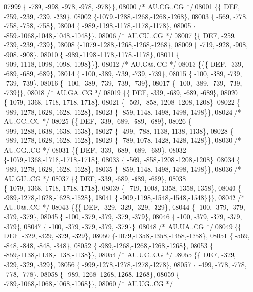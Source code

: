 \begin{DoxyCode}
07999 \{ -789, -998, -978, -978, -978\}\},
08000 \textcolor{comment}{/* AU.CG..CG */}
08001 \{\{  DEF, -259, -239, -239, -239\},
08002 \{-1079,-1288,-1268,-1268,-1268\},
08003 \{ -569, -778, -758, -758, -758\},
08004 \{ -989,-1198,-1178,-1178,-1178\},
08005 \{ -859,-1068,-1048,-1048,-1048\}\},
08006 \textcolor{comment}{/* AU.CU..CG */}
08007 \{\{  DEF, -259, -239, -239, -239\},
08008 \{-1079,-1288,-1268,-1268,-1268\},
08009 \{ -719, -928, -908, -908, -908\},
08010 \{ -989,-1198,-1178,-1178,-1178\},
08011 \{ -909,-1118,-1098,-1098,-1098\}\}\},
08012 \textcolor{comment}{/* AU.G@..CG */}
08013 \{\{\{  DEF, -339, -689, -689, -689\},
08014 \{ -100, -389, -739, -739, -739\},
08015 \{ -100, -389, -739, -739, -739\},
08016 \{ -100, -389, -739, -739, -739\},
08017 \{ -100, -389, -739, -739, -739\}\},
08018 \textcolor{comment}{/* AU.GA..CG */}
08019 \{\{  DEF, -339, -689, -689, -689\},
08020 \{-1079,-1368,-1718,-1718,-1718\},
08021 \{ -569, -858,-1208,-1208,-1208\},
08022 \{ -989,-1278,-1628,-1628,-1628\},
08023 \{ -859,-1148,-1498,-1498,-1498\}\},
08024 \textcolor{comment}{/* AU.GC..CG */}
08025 \{\{  DEF, -339, -689, -689, -689\},
08026 \{ -999,-1288,-1638,-1638,-1638\},
08027 \{ -499, -788,-1138,-1138,-1138\},
08028 \{ -989,-1278,-1628,-1628,-1628\},
08029 \{ -789,-1078,-1428,-1428,-1428\}\},
08030 \textcolor{comment}{/* AU.GG..CG */}
08031 \{\{  DEF, -339, -689, -689, -689\},
08032 \{-1079,-1368,-1718,-1718,-1718\},
08033 \{ -569, -858,-1208,-1208,-1208\},
08034 \{ -989,-1278,-1628,-1628,-1628\},
08035 \{ -859,-1148,-1498,-1498,-1498\}\},
08036 \textcolor{comment}{/* AU.GU..CG */}
08037 \{\{  DEF, -339, -689, -689, -689\},
08038 \{-1079,-1368,-1718,-1718,-1718\},
08039 \{ -719,-1008,-1358,-1358,-1358\},
08040 \{ -989,-1278,-1628,-1628,-1628\},
08041 \{ -909,-1198,-1548,-1548,-1548\}\}\},
08042 \textcolor{comment}{/* AU.U@..CG */}
08043 \{\{\{  DEF, -329, -329, -329, -329\},
08044 \{ -100, -379, -379, -379, -379\},
08045 \{ -100, -379, -379, -379, -379\},
08046 \{ -100, -379, -379, -379, -379\},
08047 \{ -100, -379, -379, -379, -379\}\},
08048 \textcolor{comment}{/* AU.UA..CG */}
08049 \{\{  DEF, -329, -329, -329, -329\},
08050 \{-1079,-1358,-1358,-1358,-1358\},
08051 \{ -569, -848, -848, -848, -848\},
08052 \{ -989,-1268,-1268,-1268,-1268\},
08053 \{ -859,-1138,-1138,-1138,-1138\}\},
08054 \textcolor{comment}{/* AU.UC..CG */}
08055 \{\{  DEF, -329, -329, -329, -329\},
08056 \{ -999,-1278,-1278,-1278,-1278\},
08057 \{ -499, -778, -778, -778, -778\},
08058 \{ -989,-1268,-1268,-1268,-1268\},
08059 \{ -789,-1068,-1068,-1068,-1068\}\},
08060 \textcolor{comment}{/* AU.UG..CG */}

\end{DoxyCode}
